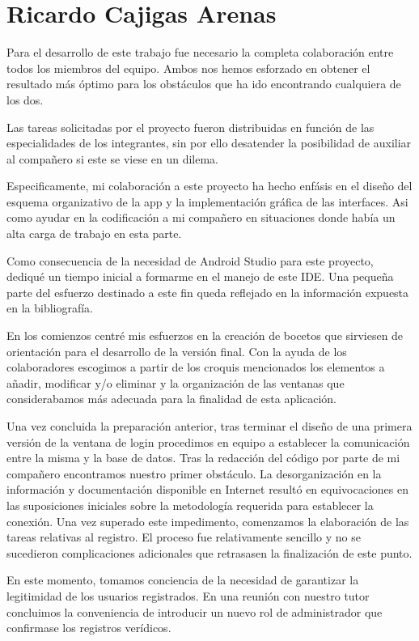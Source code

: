 \documentclass[11pt,spanish,
		listoftables,listoffigures]
		{tfgplantilla}
\begin{document}
\section{Ricardo Cajigas Arenas}
Para el desarrollo de este trabajo fue necesario la completa colaboración entre todos los miembros del equipo. Ambos nos hemos esforzado en obtener el resultado más óptimo para los obstáculos que ha ido encontrando cualquiera de los dos.

Las tareas solicitadas por el proyecto fueron distribuidas en función de las especialidades de los integrantes, sin por ello desatender la posibilidad de auxiliar al compañero si este se viese en un dilema.

Especificamente, mi colaboración a este proyecto ha hecho enfásis en el diseño del esquema organizativo de la app y la implementación gráfica de las interfaces. Asi como ayudar en la codificación a mi compañero en situaciones donde había un alta carga de trabajo en esta parte.

Como consecuencia de la necesidad de Android Studio para este proyecto, dediqué un tiempo inicial a formarme en el manejo de este IDE. Una pequeña parte del esfuerzo destinado a este fin queda reflejado en la información expuesta en la bibliografía.

En los comienzos centré mis esfuerzos en la creación de bocetos que sirviesen de orientación para el desarrollo de la versión final. Con la ayuda de los colaboradores escogimos a partir de los croquis mencionados los elementos a añadir, modificar y/o eliminar y la organización de las ventanas que considerabamos más adecuada para la finalidad de esta aplicación.

Una vez concluida la preparación anterior, tras terminar el diseño de una primera versión de la ventana de login procedimos en equipo a establecer la comunicación entre la misma y la base de datos.
Tras la redacción del código por parte de mi compañero encontramos nuestro primer obstáculo. La desorganización en la información y documentación disponible en Internet resultó en equivocaciones en las suposiciones iniciales sobre la metodología requerida para establecer la conexión.
Una vez superado este impedimento, comenzamos la elaboración de las tareas relativas al registro. El proceso fue relativamente sencillo y no se sucedieron complicaciones adicionales que retrasasen la finalización de este punto.

En este momento, tomamos conciencia de la necesidad de garantizar la legitimidad de los usuarios registrados. En una reunión con nuestro tutor concluimos la conveniencia de introducir un nuevo rol de administrador que confirmase los registros verídicos. 
\end{document}
